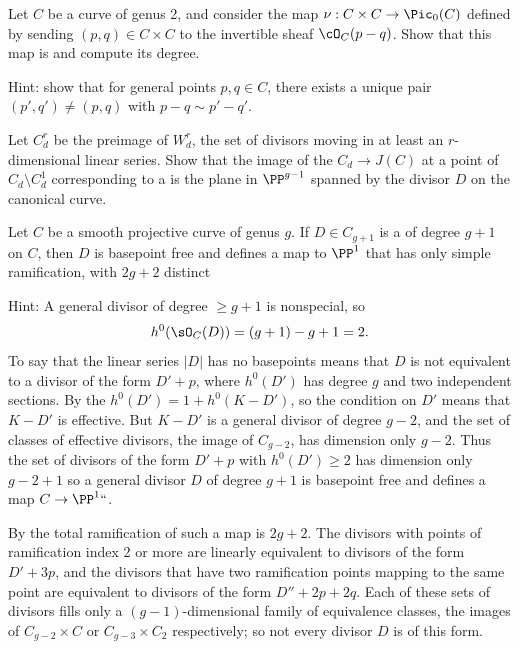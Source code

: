 \begin{exercise}
Let $C$ be a curve of genus 2, and consider the map $\nu : C \times C
\to \Pic_0(C)$ defined by sending $(p, q)\in C \times C$ to the
invertible sheaf $\cO_C(p-q)$. Show that this map is 
%
and compute its degree.

Hint: show that for general points $p, q \in C$, there exists a unique pair $(p',q') \neq (p,q)$ with $p - q \sim p'-q'$.
\end{exercise}

\begin{exercise} \label{comparison with geometric RR}
Let $C^{r}_{d}$ be the preimage of $W^{r}_{d}$, the set of divisors moving in at least an $r$-dimensional linear series.
Show that the image of the 
%
$C_{d}
\to J(C)$ at a point of $C_{d} \setminus C^1_d$  corresponding to a
%
 is  the plane in $\PP^{g-1}$ spanned by the divisor
$D$ on the canonical curve.
\end{exercise}

\begin{exercise}[$g+1$ theorem]\label{g+1 theorem} 
Let $C$ be a smooth projective curve of genus $g$. 
%
If $D \in C_{g+1}$ is a 
%
of degree $g+1$ on $C$, then 
$D$ is basepoint free and defines a  map to $\PP^1$ that has only
simple ramification, with $2g+2$ distinct  
%

Hint: 
A general divisor of degree $\geq g+1$ is nonspecial, so 
$$h^0(\sO_C(D)) = (g+1)-g+1 = 2.$$ 
To say that the linear series $|D|$ has no basepoints means that $D$ is not equivalent to a divisor of the form
$D'+p$, where $h^0(D')$ has degree $g$ and two independent sections.
By the 
%
$h^0(D') = 1+h^0(K-D')$, 
so the condition on $D'$ means that $K-D'$ is effective. 
But $K-D'$ is a general divisor of degree $g-2$, and
the set of classes of effective divisors, the image of $C_{g-2}$, has dimension only $g-2$. 
Thus the set of divisors of the form $D'+p$ with $h^0(D') \geq 2$ has dimension only $g -2 +1$
so a general divisor $D$ of degree $g+1$ is basepoint free and defines a map $C\to \PP^1` `$. 

By 
%
the total ramification of such a map is $2g+2$. The divisors with points of ramification
index 2 or more are linearly equivalent to divisors of the form $D'+3p$, and the divisors that have two ramification
points mapping to the same point are equivalent to divisors of the form $D''+2p+2q$. Each of these sets
of divisors fills only a 
$(g{-}1)$-dimensional family of equivalence classes, the images of 
$C_{g-2}\times C$ or $C_{g-3}\times C_2$ respectively; so not every divisor $D$ is of this form.
\end{exercise}


